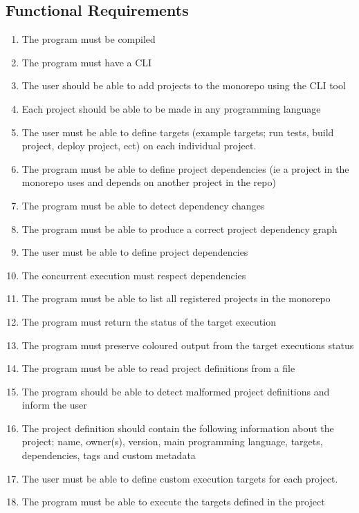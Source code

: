 \documentclass[11pt]{article}
\begin{document}
\subsection{Functional Requirements}
\label{sec:fun_req}
\begin{enumerate}
    \item The program must be compiled
    \item The program must have a \Gls{CLI}
    \item The user should be able to add projects to the monorepo using the \Gls{CLI} tool
    \item Each project should be able to be made in any programming language
    \item The user must be able to define \glspl{target} (example targets; run tests, build project, deploy project, ect) on each individual project.
    \item The program must be able to define project dependencies (ie a project in the monorepo uses and depends on another project in the repo)
    \item The program must be able to detect dependency changes
    \item The program must be able to produce a correct project dependency graph
    \item The user must be able to define project dependencies
    \item The concurrent execution must respect dependencies
    \item The program must be able to list all registered projects in the monorepo
    \item The program must return the status of the \gls{target execution}
    \item The program must preserve coloured output from the \glspl{target execution} status
    \item The program must be able to read \glspl{project definition} from a file
    \item The program should be able to detect malformed \glspl{project definition} and inform the user
    \item The project definition should contain the following information about the project; name, owner(s), version, main programming
    language, \glspl{target}, dependencies, tags and custom \gls{metadata}
    \item The user must be able to define custom execution \glspl{target} for each project.
    \item The program must be able to execute the \glspl{target} defined in the project

\end{enumerate}
\end{document}
